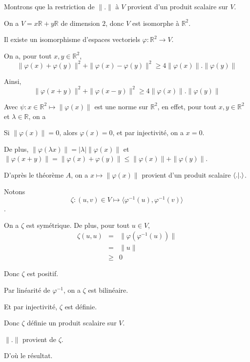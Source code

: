 Montrons que la restriction de $\| . \|$ {\`a} $V$ provient d'un produit
scalaire sur $V$.

On a $V = x\mathbb{R}+ y\mathbb{R}$ de dimension $2$, donc $V$ est isomorphe
{\`a} $\mathbb{R}^2$.

Il existe un isomorphisme d'espaces vectoriels $\varphi : \mathbb{R}^2
\rightarrow V$.

On a, pour tout $x, y \in \mathbb{R}^2$,
\[ \| \varphi (x) + \varphi (y) \|^2 + \| \varphi (x) - \varphi (y) \|^2
   \geqslant 4 \| \varphi (x) \| . \| \varphi (y) \| \]


Ainsi,
\[ \| \varphi (x + y) \|^2 + \| \varphi (x - y) \|^2 \geqslant 4 \| \varphi
   (x) \| . \| \varphi (y) \| \]


Avec $\psi : x \in \mathbb{R}^2 \longmapsto \| \varphi (x) \|$ est une norme
sur $\mathbb{R}^2$, en effet, pour tout $x, y \in \mathbb{R}^2$ et $\lambda
\in \mathbb{R}$, on a

Si $\| \varphi (x) \| = 0$, alors $\varphi (x) = 0$, et par injectivit{\'e},
on a $x = 0$.

De plus, $\| \varphi (\lambda x) \| = | \lambda | \| \varphi (x) \|$ et $\|
\varphi (x + y) \| = \| \varphi (x) + \varphi (y) \| \leqslant \| \varphi (x)
\| + \| \varphi (y) \|$.

D'apr{\`e}s le th{\'e}or{\`e}me $A$, on a $x \longmapsto \| \varphi (x) \|$
provient d'un produit scalaire $\langle . |  . \rangle$.

Notons
\[ \zeta : (u, v) \in V \longmapsto \langle \varphi^{- 1} (u), \varphi^{- 1}
   (v) \rangle \]
.

On a $\zeta$ est sym{\'e}trique. De plus, pour tout $u \in V$,
\begin{eqnarray*}
  \zeta (u, u) & = & \| \varphi (\varphi^{- 1} (u)) \|\\
  & = & \| u \|\\
  & \geqslant & 0
\end{eqnarray*}


Donc $\zeta$ est positif.

Par lin{\'e}arit{\'e} de $\varphi^{- 1}$, on a $\zeta$ est bilin{\'e}aire.

Et par injectivit{\'e}, $\zeta$ est d{\'e}finie.

Donc $\zeta$ d{\'e}finie un produit scalaire sur $V$.

$\| . \|$ provient de $\zeta$.

D'o{\`u} le r{\'e}sultat.

\

